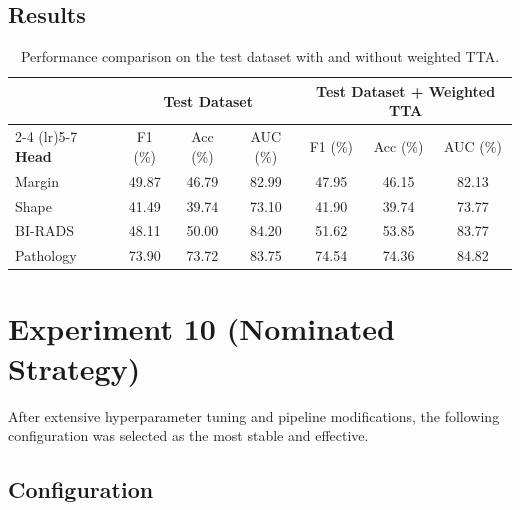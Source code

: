 \documentclass[11pt,a4paper]{article}
\begin{document}
\subsection*{Results}

\begin{table}[h]
\centering
\small
\caption{Performance comparison on the test dataset with and without weighted TTA.}
\begin{tabular}{lcccccc}
\toprule
& \multicolumn{3}{c}{\textbf{Test Dataset}} 
& \multicolumn{3}{c}{\textbf{Test Dataset + Weighted TTA}} \\
\cmidrule(lr){2-4} \cmidrule(lr){5-7}
\textbf{Head} 
& F1 (\%) & Acc (\%) & AUC (\%) 
& F1 (\%) & Acc (\%) & AUC (\%) \\
\midrule
Margin    & 49.87 & 46.79 & 82.99 & 47.95 & 46.15 & 82.13 \\
Shape     & 41.49 & 39.74 & 73.10 & 41.90 & 39.74 & 73.77 \\
BI-RADS   & 48.11 & 50.00 & 84.20 & 51.62 & 53.85 & 83.77 \\
Pathology & 73.90 & 73.72 & 83.75 & 74.54 & 74.36 & 84.82 \\
\bottomrule
\end{tabular}
\end{table}

\section{Experiment 10 (Nominated Strategy)}
After extensive hyperparameter tuning and pipeline modifications, the following configuration was selected as the most stable and effective.

\subsection*{Configuration}
\end{document}
